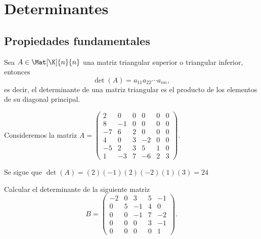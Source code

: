 \documentclass[compacto,10pt]{pubciencias-notas}
\begin{document}
\encabezado

\vspace*{-8mm}

\setcounter{section}{2}
\section{Determinantes}
\setcounter{subsection}{1}
\subsection{Propiedades fundamentales}

\begin{teo}
    Sea $A \in \Mat[\K]{n}{n}$ una matriz triangular superior o triangular inferior, entonces
    \[
        \det(A) = a_{11}a_{22} \cdots a_{nn},
    \]
    es decir, el determinante de una matriz triangular es el producto de los elementos de su diagonal principal.
\end{teo}

\begin{ejem}
    Consideremos la matriz
    $A = \begin{pmatrix}
    2 & 0 & 0 & 0 & 0 & 0 \\
    8 & -1 & 0 & 0 & 0 & 0 \\
    -7 & 6 & 2 & 0 & 0 & 0 \\
    4 & 0 & 3 & -2 & 0 & 0 \\
    -5 & 2 & 3 & 5 & 1 & 0 \\
    1 & -3 & 7 & -6 & 2 & 3
    \end{pmatrix}
    $.
    
    \noindent Se sigue que $\det(A) = (2)(-1)(2)(-2)(1)(3) = 24$
\end{ejem}

\begin{ejer}
    Calcular el determinante de la siguiente matriz
    \[
        B =
        \begin{pmatrix}
            -2 & 0 & 3 & 5 & -1 \\
            0 & 5 & -1 & 4 & 0 \\
            0 & 0 & -1 & 7 & -2 \\
            0 & 0 & 0 & 3 & -1 \\
            0 & 0 & 0 & 0 & 1
        \end{pmatrix}.
    \]
\end{ejer}

\end{document}

